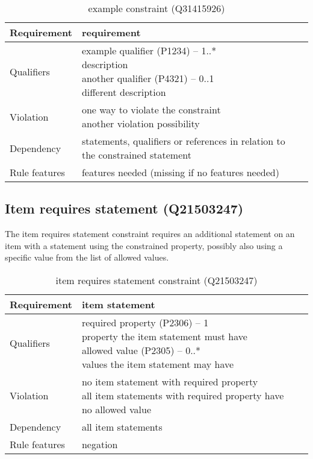 \documentclass[hyperref,bachelorofscience]{cgvpub}
\begin{document}
\begin{table}[H]
\caption{example constraint (Q31415926)}\label{tab_example_constraint}
\begin{tabularx}{\textwidth}{ ll X}
\hline
Requirement & requirement \\
\hline
Qualifiers & \makecell{example qualifier (P1234) -- 1..* \\ description \\ another qualifier (P4321) -- 0..1 \\ different description} \\
\hline
Violation & \makecell{one way to violate the constraint \\ another violation possibility} \\
\hline
Dependency & statements, qualifiers or references in relation to the constrained statement\\
\hline
Rule features & features needed (missing if no features needed) \\
\hline
\end{tabularx}
\end{table}

\newpage
\subsection{Item requires statement (Q21503247)}\label{subsec_item_requires_statement}
The item requires statement constraint requires an additional statement on an item with a statement using the constrained property, possibly also using a specific value from the list of allowed values.
\begin{table}[H]
\caption{item requires statement constraint (Q21503247)}
\begin{tabularx}{\textwidth}{ ll X}
\hline
Requirement & item statement \\
\hline
Qualifiers & \makecell{required property (P2306) -- 1 \\ property the item statement must have \\ allowed value (P2305) -- 0..* \\ values the item statement may have} \\
\hline
Violation & \makecell{no item statement with required property \\ all item statements with required property have no allowed value} \\
\hline
Dependency &  all item statements\\
\hline
Rule features & negation \\
\hline
\end{tabularx}
\end{table}
\end{document}
